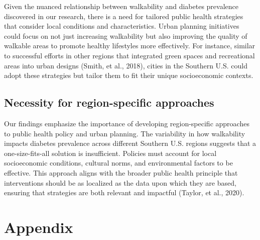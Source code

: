 \documentclass[
]{article}
\begin{document}
Given the nuanced relationship between walkability and diabetes
prevalence discovered in our research, there is a need for tailored
public health strategies that consider local conditions and
characteristics. Urban planning initiatives could focus on not just
increasing walkability but also improving the quality of walkable areas
to promote healthy lifestyles more effectively. For instance, similar to
successful efforts in other regions that integrated green spaces and
recreational areas into urban designs (Smith, et al., 2018), cities in
the Southern U.S. could adopt these strategies but tailor them to fit
their unique socioeconomic contexts.

\subsection{Necessity for region-specific
approaches}\label{necessity-for-region-specific-approaches}

Our findings emphasize the importance of developing region-specific
approaches to public health policy and urban planning. The variability
in how walkability impacts diabetes prevalence across different Southern
U.S. regions suggests that a one-size-fits-all solution is insufficient.
Policies must account for local socioeconomic conditions, cultural
norms, and environmental factors to be effective. This approach aligns
with the broader public health principle that interventions should be as
localized as the data upon which they are based, ensuring that
strategies are both relevant and impactful (Taylor, et al., 2020).

\newpage{}

\section{Appendix}\label{appendix}
\end{document}
